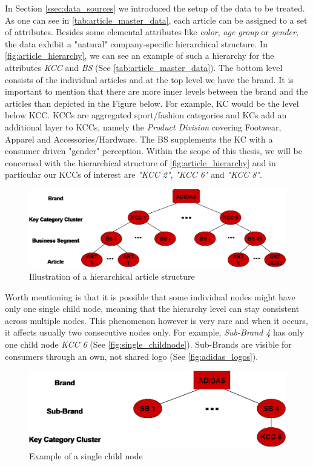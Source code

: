 
In Section \ref{ssec:data_sources} we introduced the setup of the data to be treated. As one can see in \autoref{tab:article_master_data}, each article can be assigned to a set of attributes. Besides some elemental attributes like \textit{color}, \textit{age group} or \textit{gender}, the data exhibit a "natural" company-specific hierarchical structure. In \autoref{fig:article_hierarchy}, we can see an example of such a hierarchy for the attributes \textit{\ac{KCC}} and \textit{\ac{BS}} (See \autoref{tab:article_master_data}). The bottom level consists of the individual articles and at the top level we have the brand. It is important to mention that there are more inner levels between the brand and the articles than depicted in the Figure below. For example, \ac{KC} would be the level below \ac{KCC}. \acp{KCC} are aggregated sport/fashion categories and \acp{KC} add an additional layer to \acp{KCC}, namely the \textit{Product Division} covering Footwear, Apparel and Accessories/Hardware. The \ac{BS} supplements the \ac{KC} with a consumer driven "gender" perception.
Within the scope of this thesis, we will be concerned with the hierarchical structure of \autoref{fig:article_hierarchy} and in particular our \acp{KCC} of interest are \textit{"KCC 2"}, \textit{"KCC 6"} and \textit{"KCC 8"}.

\begin{figure}[H]
\centering
  \includegraphics[width=0.95\linewidth]{figures/article_tree_KCC_BS.eps}
  \caption{Illustration of a hierarchical article structure}
  \label{fig:article_hierarchy}
\end{figure}

Worth mentioning is that it is possible that some individual nodes might have only one single child node, meaning that the hierarchy level can stay consistent across multiple nodes. This phenomenon however is very rare and when it occurs, it affects usually two consecutive nodes only. For example, \textit{Sub-Brand 4} has only one child node \textit{KCC 6} (See \autoref{fig:single_childnode}). Sub-Brands are visible for consumers through an own, not shared logo (See \autoref{fig:adidas_logos}).\\

\begin{figure}[H]
\centering
  \includegraphics[width=.7\linewidth]{figures/article_tree_single_childnode.eps}
  \caption{Example of a single child node}
  \label{fig:single_childnode}
\end{figure} 










